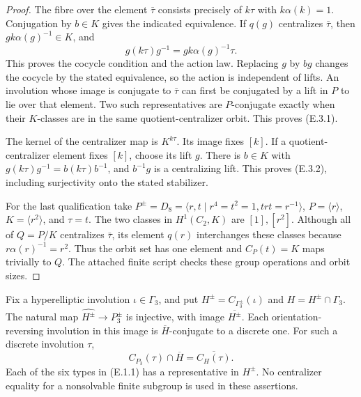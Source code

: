\begin{proof}
The fibre over the element $\bar\tau$ consists precisely of
$k\tau$ with $k\alpha(k)=1$.  Conjugation by $b\in K$ gives
the indicated equivalence.  If $q(g)$ centralizes $\bar\tau$,
then $gk\alpha(g)^{-1}\in K$, and
\[
             g(k\tau)g^{-1}=gk\alpha(g)^{-1}\tau.
\]
This proves the cocycle condition and the action law.  Replacing
$g$ by $bg$ changes the cocycle by the stated equivalence, so
the action is independent of lifts.  An involution whose image
is conjugate to $\bar\tau$ can first be conjugated by a lift
in $P$ to lie over that element.  Two such representatives
are $P$-conjugate exactly when their $K$-classes are in the
same quotient-centralizer orbit.  This proves (E.3.1).

The kernel of the centralizer map is $K^{k\tau}$.  Its image
fixes $[k]$.  If a quotient-centralizer element fixes $[k]$,
choose its lift $g$.  There is $b\in K$ with
$g(k\tau)g^{-1}=b(k\tau)b^{-1}$, and $b^{-1}g$ is a
centralizing lift.  This proves (E.3.2), including surjectivity
onto the stated stabilizer.

For the last qualification take
$P^{\pm}=D_8=\langle r,t\mid r^4=t^2=1,trt=r^{-1}\rangle$,
$P=\langle r\rangle$, $K=\langle r^2\rangle$, and $\tau=t$.
The two classes in $H^1(C_2,K)$ are $[1],[r^2]$.  Although
all of $Q=P/K$ centralizes $\bar\tau$, its element $q(r)$
interchanges these classes because $r\alpha(r)^{-1}=r^2$.
Thus the orbit set has one element and $C_P(t)=K$ maps
trivially to $Q$.  The attached finite script checks these
group operations and orbit sizes.
\end{proof}

Fix a hyperelliptic involution $\iota\in\Gamma_3$, and put
$H^{\pm}=C_{\Gamma_3^{\pm}}(\iota)$ and $H=H^{\pm}\cap\Gamma_3$.
The natural map $\widehat{H^{\pm}}\to P_3^{\pm}$ is injective,
with image $\overline{H^{\pm}}$.  Each orientation-reversing
involution in this image is $\overline H$-conjugate to a
discrete one.  For such a discrete involution $\tau$,
\[
 C_{P_3}(\tau)\cap\overline H
       =\overline{C_H(\tau)}.                               \tag{E.4.1}
\]
Each of the six types in (E.1.1) has a representative in $H^{\pm}$.
No centralizer equality for a nonsolvable finite subgroup is
used in these assertions.

